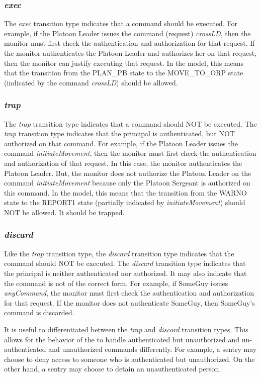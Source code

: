 \documentclass[../../main/main.tex]{subfiles}
\begin{document}
\subsubsection{\textit{exec}}
The \textit{exec} transition type indicates that a command should be executed.  For example, if the Platoon Leader issues the command (request) \textit{crossLD}, then the monitor must first check the authentication and authorization for that request.  If the monitor authenticates the Platoon Leader and authorizes her on that request, then the monitor can justify executing that request.  In the  model, this means that the transition from the PLAN_PB state to the MOVE_TO_ORP state (indicated by the command \textit{crossLD}) should be allowed. 
\subsubsection{\textit{trap}}
The \textit{trap} transition type indicates that a command should NOT be executed.  The \textit{trap} transition type indicates that the principal is authenticated, but NOT authorized on that command.  For example, if the Platoon Leader issues the command \textit{initiateMovement}, then the monitor must first check the authentication and authorization of that request.  In this case, the monitor authenticates the Platoon Leader.  But, the monitor does not authorize the Platoon Leader on the command \textit{initiateMovement} because only the Platoon Sergeant is authorized on this command.  In the  model, this means that the transition from the WARNO state to the REPORT1 state (partially indicated by \textit{initiateMovement}) should NOT be allowed.  It should be trapped.


\subsubsection{\textit{discard}}
Like the \textit{trap} transition type, the \textit{discard} transition type indicates that the command should NOT be executed.  The \textit{discard} transition type indicates that the principal is neither authenticated nor authorized.  It may also indicate that the command is not of the correct form. For example, if SomeGuy issues \textit{anyCommand}, the monitor must first check the authentication and authorization for that request. If the monitor does not authenticate SomeGuy, then SomeGuy's command is discarded.

It is useful to differentiated between the \textit{trap} and \textit{discard} transition types.  This allows for the behavior of the  to handle authenticated but unauthorized and un-authenticated and unauthorized commands differently.  For example, a sentry may choose to deny access to someone who is authenticated but unauthorized.  On the other hand, a sentry may choose to detain an unauthenticated person.
\end{document}
